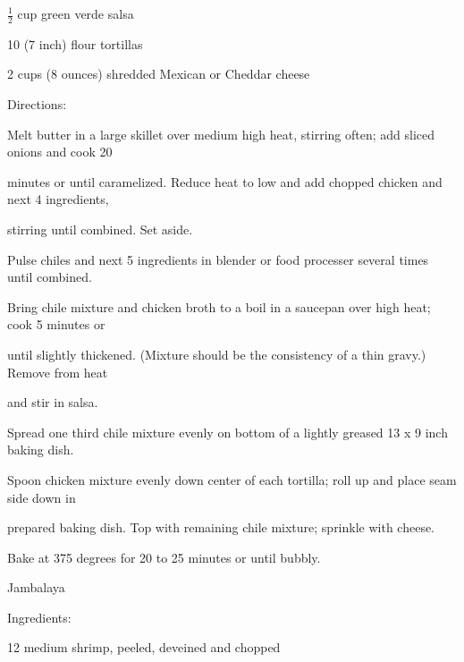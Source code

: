 \documentclass[a4paper,portrait,12pt]{book}
\begin{document}
$\frac{1}{2}$ cup green verde salsa




10 (7 inch) flour tortillas




2 cups (8 ounces) shredded Mexican or Cheddar cheese




Directions:




Melt butter in a large skillet over medium high heat, stirring often; add sliced onions and cook 20




minutes or until caramelized. Reduce heat to low and add chopped chicken and next 4 ingredients,




stirring until combined. Set aside.




Pulse chiles and next 5 ingredients in blender or food processer several times until combined.




Bring chile mixture and chicken broth to a boil in a saucepan over high heat; cook 5 minutes or




until slightly thickened. (Mixture should be the consistency of a thin gravy.) Remove from heat




and stir in salsa.




Spread one third chile mixture evenly on bottom of a lightly greased 13 x 9 inch baking dish.




Spoon chicken mixture evenly down center of each tortilla; roll up and place seam side down in




prepared baking dish. Top with remaining chile mixture; sprinkle with cheese.




Bake at 375 degrees for 20 to 25 minutes or until bubbly.







\newpage
Jambalaya




Ingredients:




12 medium shrimp, peeled, deveined and chopped
\end{document}
